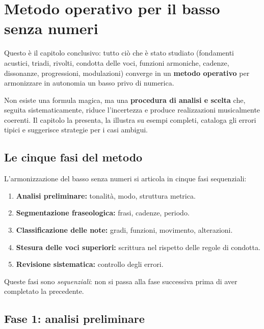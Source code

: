 \chapter{Metodo operativo per il basso senza numeri}
\label{chap:metodo_basso_senza_numeri}

Questo è il capitolo conclusivo: tutto ciò che è stato studiato (fondamenti acustici, triadi, rivolti, condotta delle voci, funzioni armoniche, cadenze, dissonanze, progressioni, modulazioni) converge in un \textbf{metodo operativo} per armonizzare in autonomia un basso privo di numerica.

Non esiste una formula magica, ma una \textbf{procedura di analisi e scelta} che, seguita sistematicamente, riduce l'incertezza e produce realizzazioni musicalmente coerenti. Il capitolo la presenta, la illustra su esempi completi, cataloga gli errori tipici e suggerisce strategie per i casi ambigui.

\section{Le cinque fasi del metodo}
\label{sec:cinque_fasi}

\begin{regola}
	\label{reg:metodo_cinque_fasi}
	L'armonizzazione del basso senza numeri si articola in cinque fasi sequenziali:
	\begin{enumerate}
		\item \textbf{Analisi preliminare:} tonalità, modo, struttura metrica.
		\item \textbf{Segmentazione fraseologica:} frasi, cadenze, periodo.
		\item \textbf{Classificazione delle note:} gradi, funzioni, movimento, alterazioni.
		\item \textbf{Stesura delle voci superiori:} scrittura nel rispetto delle regole di condotta.
		\item \textbf{Revisione sistematica:} controllo degli errori.
	\end{enumerate}
	Queste fasi sono \textit{sequenziali}: non si passa alla fase successiva prima di aver completato la precedente.
\end{regola}

\section{Fase 1: analisi preliminare}
\label{sec:fase1_basso}

